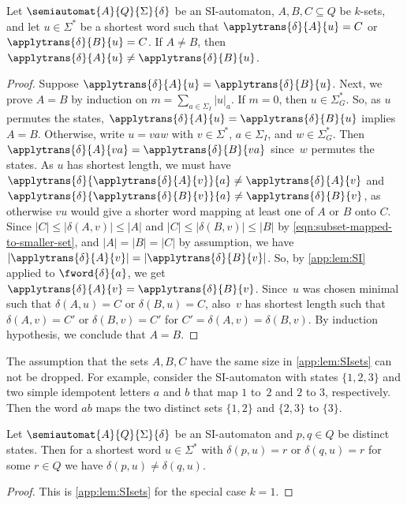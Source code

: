 \begin{lemma}
\label{app:lem:SIsets}
	Let $\semiautomat{A}{Q}{\Sigma}{\delta}$ be an SI-automaton,
	$A,B,C \subseteq Q$ be $k$-sets, and let $u \in \Sigma^*$
	be a shortest word such that $\applytrans{\delta}{A}{u} = C$ or $\applytrans{\delta}{B}{u} = C$.
	If $A \ne B$, then $\applytrans{\delta}{A}{u} \ne \applytrans{\delta}{B}{u}$.
\end{lemma}
\begin{proof}
	Suppose $\applytrans{\delta}{A}{u} = \applytrans{\delta}{B}{u}$.
	Next, we prove $A = B$
	by induction on $m = \sum_{a \in \Sigma_I} |u|_a$.
	If $m = 0$,
	then $u \in \Sigma_G^*$.
	So, as $u$ permutes the states, 
	$\applytrans{\delta}{A}{u} = \applytrans{\delta}{B}{u}$
	implies $A = B$.
	Otherwise, write $u = vaw$ with $v \in \Sigma^*$, $a \in \Sigma_I$, and $w \in\Sigma_G^*$.
	Then $\applytrans{\delta}{A}{va} = \applytrans{\delta}{B}{va}$ since~$w$ permutes the states.
	As $u$ has shortest length,
	we must have $\applytrans{\delta}{\applytrans{\delta}{A}{v}}{a} \ne \applytrans{\delta}{A}{v}$
	and $\applytrans{\delta}{\applytrans{\delta}{B}{v}}{a} \ne \applytrans{\delta}{B}{v}$,
	as otherwise $vu$ would give a shorter word mapping at least one of $A$ or $B$ onto $C$.
	Since $|C| \le |\delta(A, v)| \le |A|$ and $|C| \le |\delta(B, v)| \le |B|$ by \cref{eqn:subset-mapped-to-smaller-set},
	and $|A| = |B| = |C|$
	by assumption,
	we have $|\applytrans{\delta}{A}{v}| = |\applytrans{\delta}{B}{v}|$.
	So, by \cref{app:lem:SI} applied to $\fword{\delta}{a}$,
	we get $\applytrans{\delta}{A}{v} = \applytrans{\delta}{B}{v}$. 
	Since~$u$ was chosen minimal such that $\delta(A, u) = C$
	or $\delta(B, u) = C$, also~$v$ has shortest length
	such that $\delta(A, v) = C'$ or $\delta(B, v) = C'$
	for $C' = \delta(A, v) = \delta(B, v)$.	
	By induction hypothesis, we conclude that $A = B$.
\end{proof}

\begin{remark}
	The assumption that the sets $A, B, C$
	have the same size in \cref{app:lem:SIsets} 
	can not be dropped.
	For example, consider the SI-automaton
	with states $\{1,2,3\}$ and two simple idempotent letters $a$
	and $b$ that map $1$ to~$2$
	and $2$ to $3$, respectively.
	Then the word $ab$ maps the two distinct sets $\{1,2\}$
	and $\{2,3\}$ to $\{3\}$.	
\end{remark}

\begin{corollary} \label{app:cor:SIsets}
	Let $\semiautomat{A}{Q}{\Sigma}{\delta}$ be an SI-automaton
	and $p,q \in Q$ be distinct states.
	Then for a shortest word $u \in \Sigma^*$
	with $\delta(p, u) = r$ or $\delta(q, u) = r$ for some $r \in Q$
	we have $\delta(p, u) \ne \delta(q, u)$.	
\end{corollary}
\begin{proof}
	This is \cref{app:lem:SIsets} for the special case $k = 1$.	
\end{proof}

